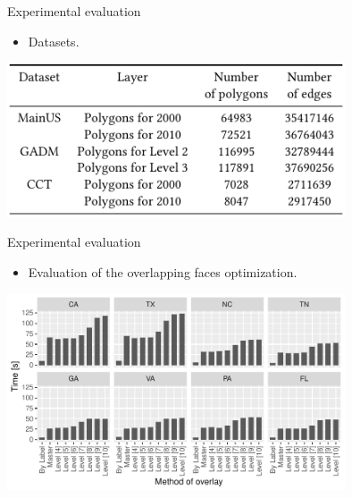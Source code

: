     \begin{frame}{Experimental evaluation}
        \begin{itemize}
            \item Datasets.
        \end{itemize}
        \vspace{1cm}
        \centering
        \includegraphics[width=0.75\textwidth]{figures/datasets}
    \end{frame}

    \begin{frame}{Experimental evaluation}
        \begin{itemize}
            \item Evaluation of the overlapping faces optimization.
        \end{itemize}
        \vspace{1cm}
        \centering
        \includegraphics[width=0.75\textwidth]{figures/overlay_tester}
    \end{frame}

